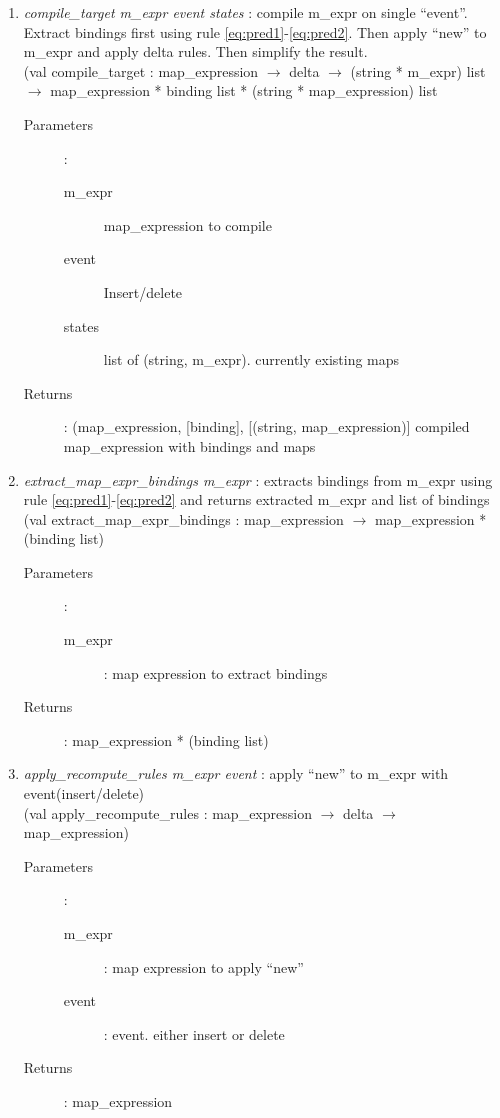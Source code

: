 \documentclass{article}
\begin{document}
\begin{enumerate}
  \item \emph{compile\_target m\_expr event states} : compile m\_expr on single ``event''.  Extract bindings first using rule \ref{eq:pred1}-\ref{eq:pred2}. Then apply ``new'' to m\_expr and 
 apply delta rules. Then simplify the result. 	\\
  (val compile\_target : map\_expression $\rightarrow$ delta $\rightarrow$ %
  (string * m\_expr) list $\rightarrow$ map\_expression * binding list * (string * map\_expression) list
      \begin{description}
      \item[Parameters] :
        \begin{description}
          \item[m\_expr] map\_expression to compile
          \item[event] Insert/delete
          \item[states] list of (string, m\_expr). currently existing maps 
        \end{description}
      \item[Returns] : (map\_expression, [binding], [(string, map\_expression)] compiled map\_expression with bindings and maps
    \end{description}
    
  \item \emph{extract\_map\_expr\_bindings m\_expr} : extracts bindings from m\_expr using rule \ref{eq:pred1}-\ref{eq:pred2} and returns extracted m\_expr and list of bindings\\
  (val extract\_map\_expr\_bindings : map\_expression $\rightarrow$ map\_expression * (binding list)
      \begin{description}
      \item[Parameters] :
        \begin{description}
          \item[m\_expr] : map expression to extract bindings 
        \end{description}
      \item[Returns] : map\_expression * (binding list)
    \end{description}
    
  \item \emph{apply\_recompute\_rules m\_expr event} : apply ``new'' to m\_expr with event(insert/delete)\\
  (val apply\_recompute\_rules : map\_expression $\rightarrow$ delta $\rightarrow$ map\_expression)
      \begin{description}
      \item[Parameters] :
        \begin{description}
          \item[m\_expr] : map expression to apply ``new''
          \item[event] : event. either insert or delete
        \end{description}
      \item[Returns] : map\_expression  
    \end{description}


\end{enumerate}
\end{document}
